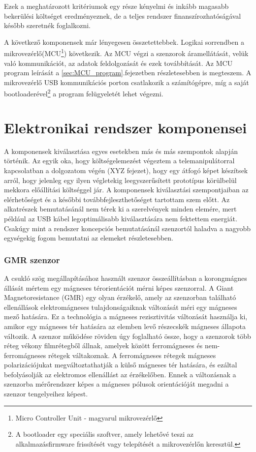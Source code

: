 Ezek a meghatározott kritériumok egy része kényelmi és inkább magasabb bekerülési költséget eredményeznek, de a teljes rendszer finanszírozhatóságával később szeretnék foglalkozni.

A következő komponensek már lényegesen összetettebbek. Logikai sorrendben a mikrovezérlő(MCU\footnote{Micro Controller Unit - magyarul mikrovezérlő}) következik. Az MCU végzi a szenzorok áramellátását, velük való kommunikációt, az adatok feldolgozását és ezek továbbítását. Az MCU program leírását a \ref{sec:MCU_program}.fejezetben részletesebben is megteszem. A mikrovezérlő USB kommunikációs porton csatlakozik a számítógépre, míg a saját bootloaderével\footnote{A bootloader egy speciális szoftver, amely lehetővé teszi az alkalmazásfirmware frissítését vagy telepítését a mikrovezérlőn keresztül.} a program felügyeletét lehet végezni.

\section{Elektronikai rendszer komponensei}

A komponensek kiválasztása egyes esetekben más és más szempontok alapján történik. Az egyik oka, hogy költségelemezést végeztem a telemanipulátorral kapcsolatban a dolgozatom végén (XYZ fejezet), hogy egy átfogó képet készítsek arról, hogy jelenleg egy ilyen végletekig leegyszerűsített prototípus körülbelül mekkora előállítási költséggel jár. A komponensek kiválasztási szempontjaiban az elérhetőséget és a későbbi továbbfejleszthetőséget tartottam szem előtt. Az alkatrészek bemutatásánál nem térek ki a szerelvények minden elemére, mert például az USB kábel legoptimálisabb kiválasztására nem fektettem energiát. Csakúgy mint a rendszer koncepciós bemutatásánál szenzortól haladva a nagyobb egységekig fogom bemutatni az elemeket részletesebben.

\subsubsection{GMR szenzor}
\label{sec:gmr_leiras}

A csukló szög megállapításához használt szenzor összeállításban a korongmágnes állását mértem egy mágneses térorientációt mérni képes szenzorral. A Giant Magnetoresistance (GMR) egy olyan érzékelő, amely az szenzorban található ellenállások elektromágneses tulajdonságaiknak változását méri egy mágneses mező hatására. Ez a technológia a mágneses rezisztivitás változását használja ki, amikor egy mágneses tér hatására az elemben levő részecskék mágneses állapota változik. A szenzor működése röviden úgy foglalható össze, hogy a szenzorok több réteg vékony filmrétegből állnak, amelyek között ferromágneses és nem-ferromágneses rétegek váltakoznak. A ferromágneses rétegek mágneses polarizációjukat megváltoztathatják a külső mágneses tér hatására, és ezáltal befolyásolják az elektromos ellenállást az érzékelőben. Ennek a változásnak a szenzorba mérőrendszer képes a mágneses pólusok orientációját megadni a szenzor tengelyeihez képest.

